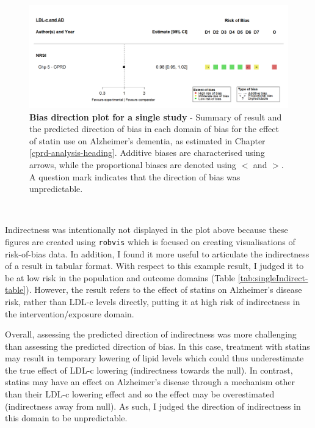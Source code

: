 \documentclass[a4paper, twoside]{templates/ociamthesis}
\begin{document}
~\\




\begin{figure}[H]
\includegraphics[width=1\linewidth]{figures/tri/midlife_AD_single} \caption[Bias direction plot example for a single study]{\textbf{Bias direction plot for a single study} - Summary of result and the predicted direction of bias in each domain of bias for the effect of statin use on Alzheimer's dementia, as estimated in Chapter \ref{cprd-analysis-heading}. Additive biases are characterised using arrows, while the proportional biases are denoted using \(<\) and \(>\). A question mark indicates that the direction of bias was unpredictable.}\label{fig:biasDirectionSingle}
\end{figure}

~

Indirectness was intentionally not displayed in the plot above because these figures are created using \texttt{robvis} which is focused on creating visualisations of risk-of-bias data. In addition, I found it more useful to articulate the indirectness of a result in tabular format. With respect to this example result, I judged it to be at low risk in the population and outcome domains (Table \ref{tab:singleIndirect-table}). However, the result refers to the effect of statins on Alzheimer's disease risk, rather than LDL-c levels directly, putting it at high risk of indirectness in the intervention/exposure domain.

Overall, assessing the predicted direction of indirectness was more challenging than assessing the predicted direction of bias. In this case, treatment with statins may result in temporary lowering of lipid levels which could thus underestimate the true effect of LDL-c lowering (indirectness towards the null). In contrast, statins may have an effect on Alzheimer's disease through a mechanism other than their LDL-c lowering effect and so the effect may be overestimated (indirectness away from null). As such, I judged the direction of indirectness in this domain to be unpredictable.
\end{document}
